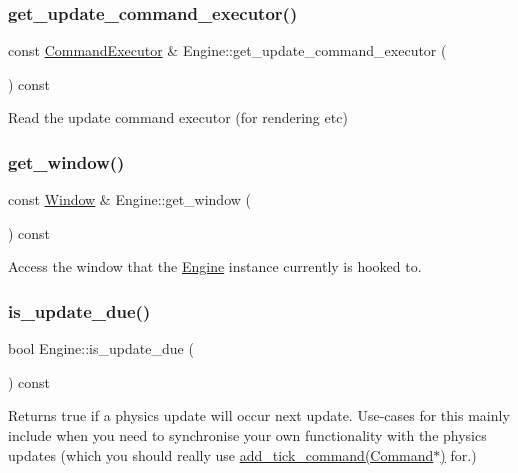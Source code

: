 \subsubsection{\texorpdfstring{get\+\_\+update\+\_\+command\+\_\+executor()}{get\_update\_command\_executor()}}
{\footnotesize\ttfamily const \mbox{\hyperlink{class_command_executor}{Command\+Executor}} \& Engine\+::get\+\_\+update\+\_\+command\+\_\+executor (\begin{DoxyParamCaption}{ }\end{DoxyParamCaption}) const}

Read the update command executor (for rendering etc) \mbox{\label{class_engine_a30c10f14f67c8f6b0b6d0f47393ea31c}} 
\subsubsection{\texorpdfstring{get\+\_\+window()}{get\_window()}}
{\footnotesize\ttfamily const \mbox{\hyperlink{class_window}{Window}} \& Engine\+::get\+\_\+window (\begin{DoxyParamCaption}{ }\end{DoxyParamCaption}) const}

Access the window that the \mbox{\hyperlink{class_engine}{Engine}} instance currently is hooked to. \mbox{\label{class_engine_a6ae98509fe0117b583f9edb6812e3363}} 
\subsubsection{\texorpdfstring{is\+\_\+update\+\_\+due()}{is\_update\_due()}}
{\footnotesize\ttfamily bool Engine\+::is\+\_\+update\+\_\+due (\begin{DoxyParamCaption}{ }\end{DoxyParamCaption}) const}

Returns true if a physics update will occur next update. Use-\/cases for this mainly include when you need to synchronise your own functionality with the physics updates (which you should really use \mbox{\hyperlink{class_engine_ab2355e889851bc53a6a9e151ca2a1e98}{add\+\_\+tick\+\_\+command(\+Command$\ast$)}} for.) \mbox{\label{class_engine_abb354476292180d9db9b4b70d3057096}} 
